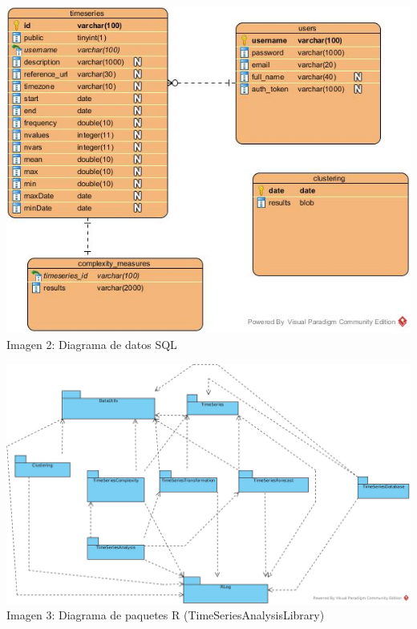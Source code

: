 \documentclass[14pt]{extarticle}
\theoremstyle{definition}
\theoremstyle{remark}
\begin{document}
\begin{center}
\includegraphics[scale=0.7]{Database.jpg}
\\Imagen 2: Diagrama de datos SQL
\end{center}

\begin{landscape}
	\begin{center}
	\includegraphics[scale=0.6]{TimeSeriesAnalysisLibrary.jpg}
	\\Imagen 3: Diagrama de paquetes R (TimeSeriesAnalysisLibrary)
	\end{center}
\end{landscape}
\end{document}
